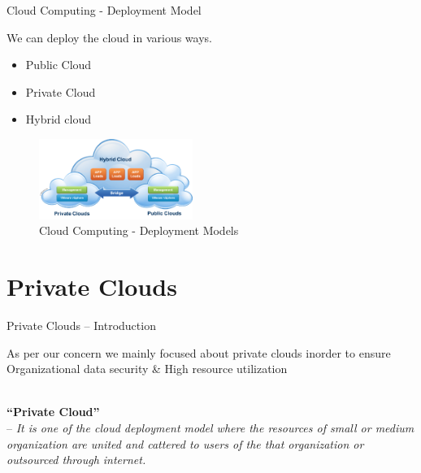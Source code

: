 \documentclass[xcolor=dvipsnames]{beamer}
\begin{document}
\begin{frame}{Cloud Computing - Deployment Model }

We can deploy the cloud in various ways.

\begin{itemize}
\item Public Cloud
\item Private Cloud
\item Hybrid cloud
\end{itemize}

\begin{figure}[H]
 \centering
 \includegraphics[width=5cm]{./model.png}
 \caption{Cloud Computing - Deployment Models \label{fig:model} }
\end{figure}
\end{frame}

\section{Private Clouds}
\begin{frame}{Private Clouds -- Introduction}

As per our concern we mainly focused about private clouds inorder to ensure Organizational data security \& High resource utilization

\hspace{4cm}\\

\textbf{``Private Cloud''} \\ 
\hspace{16mm} -- \textit{It is one of the cloud deployment model where the resources of small or medium organization are united and cattered to users of the that organization or outsourced through internet.} 

\end{frame}
\end{document}
